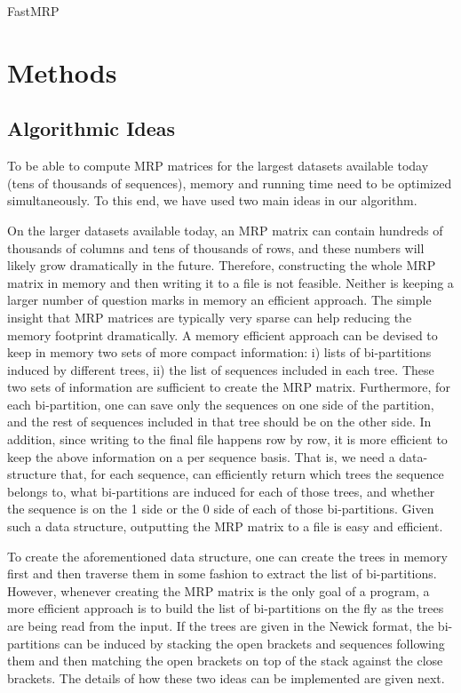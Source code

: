 \documentclass[a4paper,10pt]{article}
\title{}
\author{}
\begin{document}
\maketitle FastMRP

\section{Methods}
\subsection{Algorithmic Ideas}
To be able to compute MRP matrices for the largest datasets available today
(tens of thousands of sequences), memory and running time need to be optimized
simultaneously. To this end, we have used two main ideas in our algorithm.

On the larger datasets available today, an MRP matrix can contain hundreds
of thousands of columns and tens of thousands of rows, and these numbers will
likely grow dramatically in the future. Therefore, constructing the whole MRP
matrix in memory and then writing it to a file is not feasible. Neither is
keeping a larger number of question marks in memory an efficient approach. The
simple insight that MRP matrices are typically
very sparse can help reducing the memory footprint dramatically. A memory
efficient approach can be devised to keep in memory two sets of more compact
information: i) lists of bi-partitions induced by different trees, ii) the list
of sequences included in each tree. These two sets of information are sufficient
to create the MRP matrix. Furthermore, for each bi-partition, one can save
only the sequences on one side of the partition, and the rest of sequences
included in that tree should be on the other side. In addition, since writing to
the final file happens row by row, it is more efficient to keep the above
information on a per sequence basis. That is, we need a data-structure that, for
each sequence, can efficiently return which trees the sequence belongs to,
what bi-partitions are induced for each of those trees, and whether the sequence
is on the 1 side or the 0 side of each of those bi-partitions. Given such a data
structure, outputting the MRP matrix to a file is easy and efficient.

To create the aforementioned data structure, one can create the trees in memory
first and then traverse them in some fashion to extract the list of
bi-partitions. However, whenever creating the MRP matrix is the only goal of a
program, a more efficient approach is to build the list of bi-partitions on the
fly as the trees are being read from the input. If the trees are given in the
Newick format, the bi-partitions can be induced by stacking the open brackets
and sequences following them and then matching the open brackets on top
of the stack against the close brackets. The details of how these two
ideas can be implemented are given next. 
\end{document}
